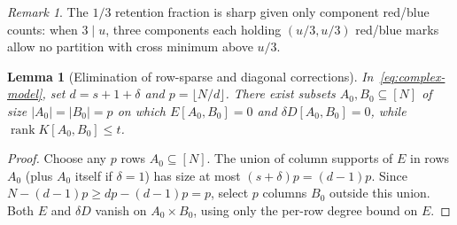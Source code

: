 \documentclass[11pt,reqno]{amsart}
\numberwithin{equation}{section}
\newtheorem{lemma}[theorem]{Lemma}
\theoremstyle{definition}
\theoremstyle{remark}
\newtheorem{remark}[theorem]{Remark}
\newcommand{\rank}{\operatorname{rank}}
\begin{document}
\begin{remark}
The $1/3$ retention fraction is sharp given only component red/blue counts: when $3\mid u$, three components each holding $(u/3,u/3)$ red/blue marks allow no partition with cross minimum above $u/3$.
\end{remark}

\begin{lemma}[Elimination of row-sparse and diagonal corrections]
\label{lem:sparse-elim}
In~\eqref{eq:complex-model}, set $d = s + 1 + \delta$ and $p = \lfloor N/d\rfloor$. There exist subsets $A_0,B_0\subseteq[N]$ of size $|A_0|=|B_0|=p$ on which $E[A_0,B_0] = 0$ and $\delta D[A_0,B_0] = 0$, while $\rank K[A_0,B_0]\le t$.
\end{lemma}

\begin{proof}
Choose any $p$ rows $A_0\subseteq[N]$. The union of column supports of $E$ in rows $A_0$ (plus $A_0$ itself if $\delta=1$) has size at most $(s+\delta)p = (d-1)p$. Since $N - (d-1)p \ge dp - (d-1)p = p$, select $p$ columns $B_0$ outside this union. Both $E$ and $\delta D$ vanish on $A_0\times B_0$, using only the per-row degree bound on $E$.
\end{proof}
\end{document}
